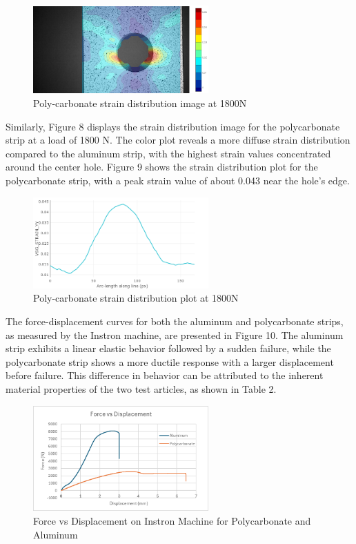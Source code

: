 \documentclass{article}
\begin{document}
\begin{figure}[H]
    \centering
    \includegraphics[width = 0.6\textwidth]{lab9images/1800Npccolored_strainyy.PNG}
    \caption{Poly-carbonate strain distribution image at 1800N}
    \label{fig:PC1800Npic}
\end{figure}

Similarly, Figure 8 displays the strain distribution image for the polycarbonate strip at a load of 1800 N. The color plot reveals a more diffuse strain distribution compared to the aluminum strip, with the highest strain values concentrated around the center hole. Figure 9 shows the strain distribution plot for the polycarbonate strip, with a peak strain value of about 0.043 near the hole's edge.

\begin{figure}[H]
    \centering
    \includegraphics[width = 0.6\textwidth]{lab9images/1800Npcplot_strainyy.png}
    \caption{Poly-carbonate strain distribution plot at 1800N}
    \label{fig:PC1800Nplot}
\end{figure}

The force-displacement curves for both the aluminum and polycarbonate strips, as measured by the Instron machine, are presented in Figure 10. The aluminum strip exhibits a linear elastic behavior followed by a sudden failure, while the polycarbonate strip shows a more ductile response with a larger displacement before failure. This difference in behavior can be attributed to the inherent material properties of the two test articles, as shown in Table 2.

\begin{figure}[H]
    \centering
    \includegraphics[width = 0.6\textwidth]{lab9images/forcevsdisplacement.png}
    \caption{Force vs Displacement on Instron Machine for Polycarbonate and Aluminum}
    \label{fig:forcedisplacement}
\end{figure}
\end{document}
